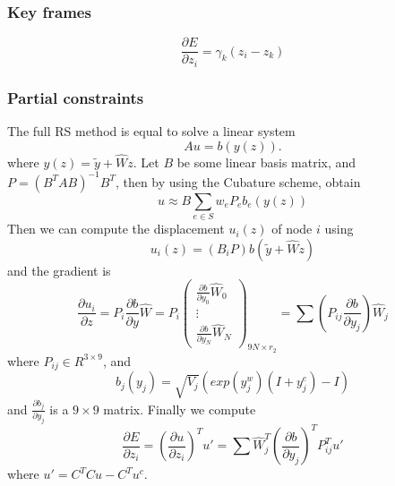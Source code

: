 \documentclass[9pt,twocolumn]{extarticle}
\begin{document}
\subsubsection{Key frames} 
\begin{equation} \label{key_grad}
  {\frac{\partial{E}}{\partial{z_i}}} = \gamma_k(z_i-z_k)
\end{equation}

\subsubsection{Partial constraints}
The full RS method is equal to solve a linear system
\begin{equation} \label{rs}
  Au = b(y(z)).
\end{equation}
where $y(z) = \tilde{y} + \hat{W}z$. Let $B$ be some linear basis matrix, and
$P=(B^TAB)^{-1}B^T$, then by using the Cubature scheme, obtain
\begin{equation} \label{reduced_rs3}
  u \approx B\sum_{e\in{S}}w_eP_e{b_e(y(z))}
\end{equation}
Then we can compute the displacement $u_i(z)$ of node $i$ using
\begin{equation}
  u_i(z) = (B_iP)b(\tilde{y} + \hat{W}z)
\end{equation}
and the gradient is
\begin{equation}
  \frac{\partial{u_i}}{\partial{z}} = P_i \frac{\partial{b}}{\partial{y}}
  \hat{W} = P_i
  \left( \begin{array}{c}
      \frac{\partial{b}}{\partial{y_0}} \hat{W}_0\\
      \vdots\\
      \frac{\partial{b}}{\partial{y_N}} \hat{W}_N
    \end{array} \right)_{9N\times r_2} = 
  \sum(P_{ij}\frac{\partial{b}}{\partial{y_j}})\hat{W}_j
\end{equation}
where $P_{ij}\in R^{3\times 9}$, and
\begin{equation}
  b_j(y_j) = \sqrt{V_j}(exp(y_j^w)(I+y_j^e)-I)
\end{equation}
and $\frac{\partial{b_j}}{\partial{y_j}}$ is a $9\times9$ matrix. Finally we
compute 
\begin{equation} \label{compPePz}
  {\frac{\partial{E}}{\partial{z_i}}} =
  (\frac{\partial{u}}{\partial{z_i}})^Tu' =
  \sum\hat{W}_j^T(\frac{\partial{b}}{\partial{y_j}})^TP_{ij}^Tu'
\end{equation}
where $u' = C^TCu-C^Tu^c$.
\end{document}
